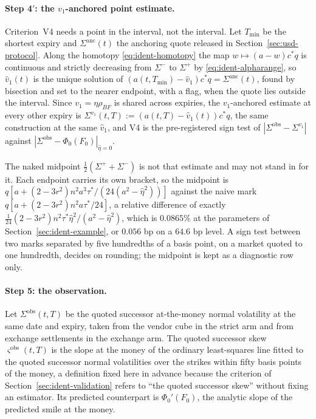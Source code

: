 \documentclass[../../../main.tex]{subfiles}
\begin{document}
\paragraph{Step 4$'$: the $v_1$-anchored point estimate.} Criterion~V4 needs a point in the interval, not the interval. Let $T_{\min}$ be the shortest expiry and $\Sigma^{\mathrm{anc}}(t)$ the anchoring quote released in Section~\ref{sec:usd-protocol}. Along the homotopy \eqref{eq:ident-homotopy} the map $w\mapsto(a-w)c^*q$ is continuous and strictly decreasing from $\Sigma^-$ to $\Sigma^+$ by \eqref{eq:ident-alpharange}, so $\hat v_1(t)$ is the unique solution of $(a(t,T_{\min})-\hat v_1)c^*q=\Sigma^{\mathrm{anc}}(t)$, found by bisection and set to the nearer endpoint, with a flag, when the quote lies outside the interval. Since $v_1=\eta\rho_{BF}$ is shared across expiries, the $v_1$-anchored estimate at every other expiry is $\Sigma^{v_1}(t,T):=(a(t,T)-\hat v_1(t))c^*q$, the same construction at the same $\hat v_1$, and V4 is the pre-registered sign test of $|\Sigma^{\mathrm{obs}}-\Sigma^{v_1}|$ against $|\Sigma^{\mathrm{obs}}-\Phi_0(F_0)|_{\hat\eta=0}$.

The naked midpoint $\tfrac12(\Sigma^++\Sigma^-)$ is not that estimate and may not stand in for it. Each endpoint carries its own bracket, so the midpoint is $q[a+(2-3r^2)n^2a^3\tau^*/(24(a^2-\hat\eta^2))]$ against the naive mark $q[a+(2-3r^2)n^2a\tau^*/24]$, a relative difference of exactly $\tfrac1{24}(2-3r^2)n^2\tau^*\hat\eta^2/(a^2-\hat\eta^2)$, which is $0.0865\%$ at the parameters of Section~\ref{sec:ident-example}, or $0.056$ bp on a $64.6$ bp level. A sign test between two marks separated by five hundredths of a basis point, on a market quoted to one hundredth, decides on rounding; the midpoint is kept as a diagnostic row only.

\paragraph{Step 5: the observation.} Let $\Sigma^{\mathrm{obs}}(t,T)$ be the quoted successor at-the-money normal volatility at the same date and expiry, taken from the vendor cube in the strict arm and from exchange settlements in the exchange arm. The quoted successor skew $\varsigma^{\mathrm{obs}}(t,T)$ is the slope at the money of the ordinary least-squares line fitted to the quoted successor normal volatilities over the strikes within fifty basis points of the money, a definition fixed here in advance because the criterion of Section~\ref{sec:ident-validation} refers to ``the quoted successor skew'' without fixing an estimator. Its predicted counterpart is $\Phi_0'(F_0)$, the analytic slope of the predicted smile at the money.
\end{document}
